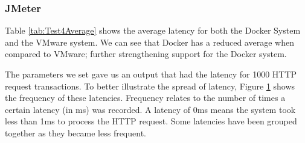 \subsubsection{JMeter}
Table \ref{tab:Test4Average} shows the average latency for both the Docker System and the VMware system. We can see that Docker has a reduced average when compared to VMware; further strengthening support for the Docker system.

\begin{table}[H]
\centering
\caption{}
\label{tab:Test4Average}
\end{table}

The parameters we set gave us an output that had the latency for 1000 HTTP request transactions. To better illustrate the spread of latency, Figure \ref{fig:Test4JMeterGraph} shows the frequency of these latencies. Frequency relates to the number of times a certain latency (in ms) was recorded. A latency of 0ms means the system took less than 1ms to process the HTTP request. Some latencies have been grouped together as they became less frequent.

\begin{figure}[H]
\caption{}
\label{fig:Test4JMeterGraph}
\centering
\end{figure}

